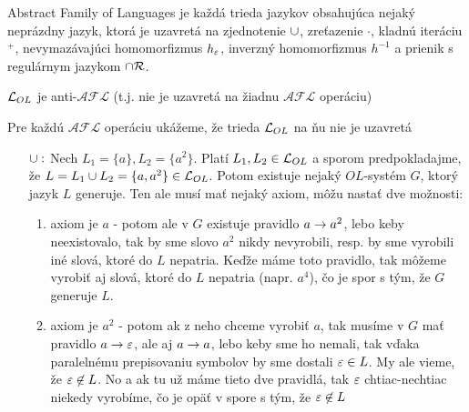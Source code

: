
\begin{definicia}
  Abstract Family of Languages je každá trieda
  jazykov obsahujúca nejaký neprázdny jazyk, ktorá je uzavretá na
  zjednotenie $\cup$, zreťazenie $\cdot$, kladnú iteráciu $^+$,
  nevymazávajúci homomorfizmus $h_{\varepsilon}$,
  inverzný homomorfizmus $h^{-1}$ a prienik s regulárnym jazykom
  $\cap \mathcal{R}$.
\end{definicia}

\begin{veta}
  $\mathcal{L}_{OL}$ je anti-$\mathcal{AFL}$ (t.j. nie je uzavretá
  na žiadnu $\mathcal{AFL}$ operáciu)
\end{veta}

\begin{dokaz}
    Pre každú $\mathcal{AFL}$ operáciu ukážeme, že trieda
    $\mathcal{L}_{OL}$ na ňu nie je uzavretá

    \begin{itemize}
    \item[$\cup:$] Nech $L_1 = \{ a \}, L_2=\{ a^2 \}$.
        Platí $L_1,L_2 \in \mathcal{L}_{OL}$ a sporom
        predpokladajme, že $L=L_1 \cup L_2 = \{ a, a^2 \}\in \mathcal{L}_{OL}$.
        Potom existuje nejaký $OL$-systém $G$, ktorý jazyk $L$
        generuje. Ten ale musí mať nejaký axiom, môžu nastať dve možnosti:
        \begin{enumerate}
        \item axiom je $a$ - potom ale v $G$ existuje pravidlo 
            $a\rightarrow a^2$,
            lebo keby neexistovalo, tak by sme slovo $a^2$ nikdy
            nevyrobili, resp. by sme vyrobili iné slová, ktoré do $L$
            nepatria. Keďže máme toto pravidlo, tak môžeme vyrobiť aj slová,
            ktoré do $L$ nepatria (napr. $a^4$), čo je spor s tým, že
            $G$ generuje $L$.

        \item axiom je $a^{2}$ - potom ak z neho chceme vyrobiť $a$, tak
            musíme v $G$ mať pravidlo $a\rightarrow\varepsilon$,
            ale aj $a\rightarrow a$, lebo
            keby sme ho nemali, tak vďaka paralelnému prepisovaniu symbolov by
            sme dostali $\varepsilon \in L$. My ale vieme, že
            $\varepsilon\not\in L$. No a ak tu už máme tieto dve pravidlá, tak
            $\varepsilon$ chtiac-nechtiac niekedy vyrobíme, čo je opäť v spore
            s tým, že $\varepsilon\not\in L$
        \end{enumerate}


\end{itemize}
\end{dokaz}
